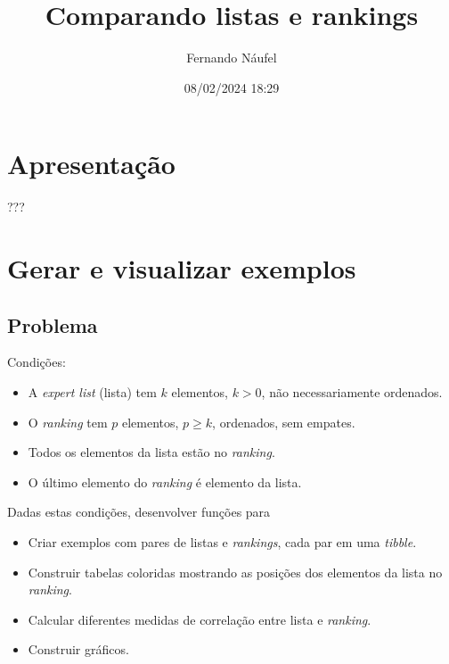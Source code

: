\documentclass[
  letterpaper,
  DIV=11,
  numbers=noendperiod]{scrreprt}
\title{Comparando listas e rankings}
\author{Fernando Náufel}
\date{08/02/2024 18:29}
\renewcommand*\contentsname{Índice}
\newcommand\contentsname{Índice}
\begin{document}
\maketitle


\renewcommand*\contentsname{Índice}
{
\hypersetup{linkcolor=}
\setcounter{tocdepth}{2}
\tableofcontents
}

\chapter*{Apresentação}\label{apresentauxe7uxe3o}


???


\chapter{Gerar e visualizar exemplos}\label{gerar-e-visualizar-exemplos}

\section{Problema}\label{problema}

Condições:

\begin{itemize}
\item
  A \emph{expert list} (lista) tem $k$ elementos, $k > 0$, não
  necessariamente ordenados.
\item
  O \emph{ranking} tem $p$ elementos, $p \geq k$, ordenados, sem
  empates.
\item
  Todos os elementos da lista estão no \emph{ranking}.
\item
  O último elemento do \emph{ranking} é elemento da lista.
\end{itemize}

Dadas estas condições, desenvolver funções para

\begin{itemize}
\item
  Criar exemplos com pares de listas e \emph{rankings}, cada par em uma
  \emph{tibble}.
\item
  Construir tabelas coloridas mostrando as posições dos elementos da
  lista no \emph{ranking}.
\item
  Calcular diferentes medidas de correlação entre lista e
  \emph{ranking}.
\item
  Construir gráficos.
\end{itemize}
\end{document}

